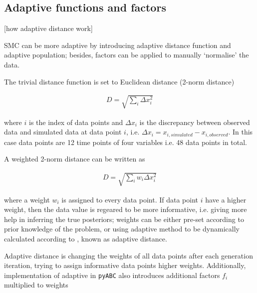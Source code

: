 



\subsection{Adaptive functions and factors}

[how adaptive distance work]

SMC can be more adaptive by introducing adaptive distance function and adaptive population; besides, factors can be applied to manually `normalise' the data.

The trivial distance function is set to Euclidean distance (2-norm distance)

\begin{align}
    \label{eq:dis}
    D=\sqrt{\sum_i \Delta x_i^2}
\end{align}

where $i$ is the index of data points and $\Delta x_i$ is the discrepancy between  observed data and simulated data at data point $i$, i.e. $\Delta x_i = x_{i, simulated}-x_{i, observed}$. In this case data points are 12 time points of four variables i.e. 48 data points in total.

A weighted 2-norm distance can be written as

\begin{align}
    \label{dis_w}
    D=\sqrt{\sum_i w_i \Delta x_i^2}
\end{align}

where a weight $w_i$ is assigned to every data point. If data point $i$ have a higher weight, then the data value is regeared to be more informative, i.e. giving more help in inferring the true posteriors; weights can be either pre-set according to prior knowledge of the problem, or using adaptive method to be dynamically calculated according to , known as adaptive distance.

Adaptive distance is changing the weights of all data points after each generation iteration, trying to assign informative data points higher weights. Additionally, implementation of adaptive in \verb|pyABC| also introduces additional factors $f_i$ multiplied to weights \cite{ref:adpt_dis}

